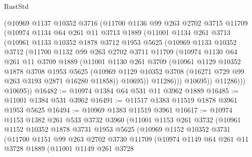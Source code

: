 \begin{lexlean}{RustStd}
\begin{coremodule}
        (@10969
          @1137
          @10352
          @3716
          (@11700
            @1136
            @99
            @263
            @2702
            @3715
            @11709
            (@10974
              @1134
              @64
              @261
              @11
              @3713
              @1889
              (@11001
                @1134
                @261
                @3713
                (@10961
                  @1133
                  @10352
                  @1878
                  @3712
                  @1953
                  @5625
                  (@10969
                    @1133
                    @10352
                    @3712
                    (@11700
                      @1132
                      @99
                      @263
                      @2702
                      @3711
                      @11709
                      (@10974
                        @1130
                        @64
                        @261
                        @11
                        @3709
                        @1889
                        (@11001
                          @1130
                          @261
                          @3709
                          (@10961
                            @1129
                            @10352
                            @1878
                            @3708
                            @1953
                            @5625
                            (@10969
                              @1129
                              @10352
                              @3708
                              (@16271 @729 @99 @263 @3193 @2871 @16280 @11858))
                            @10695))
                        @11286)))
                  @10695))
              @11286)))
        @10695))
@16482 := @10974 @1384 @64 @531 @11 @3962 @1889
@16485 := @11001 @1384 @531 @3962
@16491 := @11517 @1383 @11519 @1878 @3961 @1953 @5625
@16494 := @10969 @1383 @11519 @3961
@16617 := @10974
    @1153
    @1382
    @261
    @533
    @3732
    @3960
    (@11001
      @1153
      @261
      @3732
      (@10961
        @1152
        @10352
        @1878
        @3731
        @1953
        @5625
        (@10969
          @1152
          @10352
          @3731
          (@11700
            @1151
            @99
            @263
            @2702
            @3730
            @11709
            (@10974
              @1149
              @64
              @261
              @11
              @3728
              @1889
              (@11001
                @1149
                @261
                @3728

\end{coremodule}
\end{lexlean}
